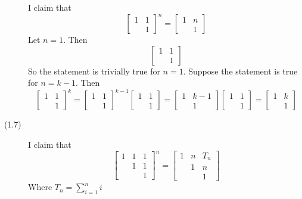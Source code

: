 \begin{description}
I claim that
$$\begin{bmatrix}
1 & 1 \\
& 1
\end{bmatrix}^n = \begin{bmatrix}
1 & n \\
& 1
\end{bmatrix}$$
Let $n = 1$. Then
$$\begin{bmatrix}
1 & 1 \\
& 1
\end{bmatrix}$$
So the statement is trivially true for $n = 1$. Suppose the statement is true for $n = k - 1$. Then
$$\begin{bmatrix}
1 & 1 \\
& 1
\end{bmatrix}^k = \begin{bmatrix}
1 & 1 \\
& 1
\end{bmatrix}^{k-1}\begin{bmatrix}
1 & 1 \\
& 1
\end{bmatrix} = \begin{bmatrix}
1 & k - 1 \\
& 1
\end{bmatrix}\begin{bmatrix}
1 & 1 \\
& 1
\end{bmatrix} = \begin{bmatrix}
1 & k \\
& 1
\end{bmatrix}$$
\item[(1.7)]
I claim that
$$\begin{bmatrix}
1 & 1 & 1 \\
& 1 & 1 \\
& & 1
\end{bmatrix}^n = \begin{bmatrix}
1 & n & T_n \\
& 1 & n \\
& & 1
\end{bmatrix}$$
Where $T_n = \sum_{i=1}^n i$


\end{description}
